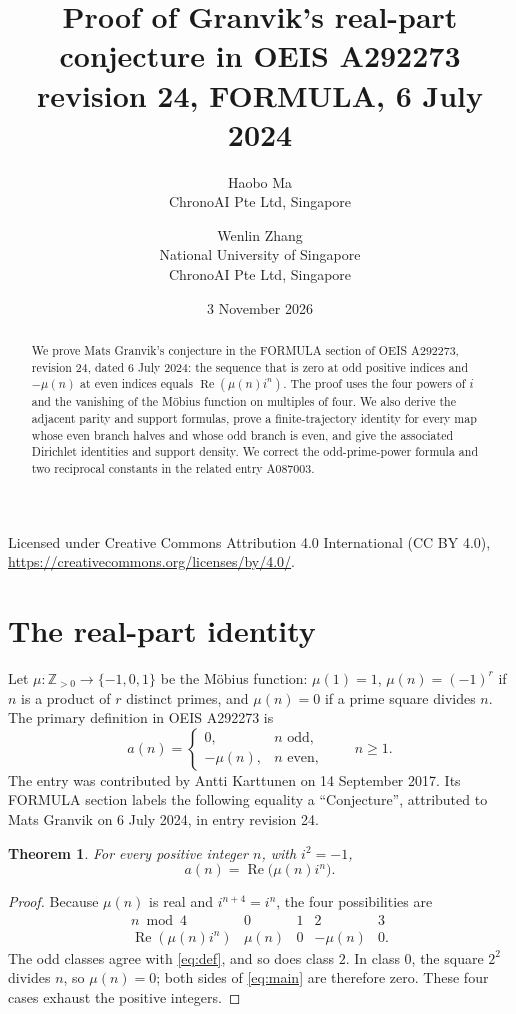 \documentclass[11pt]{article}
\title{Proof of Granvik's real-part conjecture in OEIS A292273\\
\large revision 24, FORMULA, 6 July 2024}
\author{Haobo Ma\\\small ChronoAI Pte Ltd, Singapore
\and Wenlin Zhang\\\small National University of Singapore\\
\small ChronoAI Pte Ltd, Singapore}
\date{3 November 2026}
\newtheorem{theorem}{Theorem}
\newcommand{\Rea}{\operatorname{Re}}
\begin{document}
\maketitle
\begin{abstract}
We prove Mats Granvik's conjecture in the FORMULA section of OEIS
A292273, revision 24, dated 6 July 2024: the sequence that is zero at odd positive
indices and $-\mu(n)$ at even indices equals $\Rea(\mu(n)i^n)$.
The proof uses the four powers of $i$ and the vanishing of the M\"obius
function on multiples of four. We also derive the adjacent parity and
support formulas, prove a finite-trajectory identity for every map whose
even branch halves and whose odd branch is even, and give the associated
Dirichlet identities and support density. We correct the odd-prime-power
formula and two reciprocal constants in the related entry A087003.
\end{abstract}
\noindent\small Licensed under Creative Commons Attribution 4.0 International
(CC BY 4.0), \url{https://creativecommons.org/licenses/by/4.0/}.\normalsize

\section{The real-part identity}
Let $\mu:\mathbb Z_{>0}\to\{-1,0,1\}$ be the M\"obius function:
$\mu(1)=1$, $\mu(n)=(-1)^r$ if $n$ is a product of $r$ distinct
primes, and $\mu(n)=0$ if a prime square divides $n$.
The primary definition in OEIS A292273 \cite{entry} is
\begin{equation}\label{eq:def}
 a(n)=\begin{cases}0,&n\text{ odd},\\-\mu(n),&n\text{ even},\end{cases}
 \qquad n\geq1.
\end{equation}
The entry was contributed by Antti Karttunen on 14 September 2017.
Its FORMULA section labels the following equality a ``Conjecture'',
attributed to Mats Granvik on 6 July 2024, in entry revision 24.

\begin{theorem}\label{thm:main}
For every positive integer $n$, with $i^2=-1$,
\begin{equation}\label{eq:main}
 a(n)=\Rea\bigl(\mu(n)i^n\bigr).
\end{equation}
\end{theorem}
\begin{proof}
Because $\mu(n)$ is real and $i^{n+4}=i^n$, the four possibilities are
\[
\begin{array}{c|rrrr}
n\bmod4&0&1&2&3\\\hline
\Rea(\mu(n)i^n)&\mu(n)&0&-\mu(n)&0.
\end{array}
\]
The odd classes agree with \eqref{eq:def}, and so does class $2$.
In class $0$, the square $2^2$ divides $n$, so $\mu(n)=0$;
both sides of \eqref{eq:main} are therefore zero. These four cases
exhaust the positive integers.
\end{proof}
\end{document}
